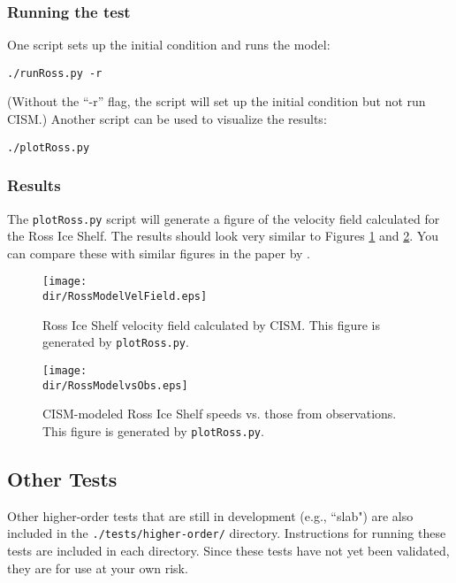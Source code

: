 \subsubsection{Running the test}
One script sets up the initial condition and runs the model:

\texttt{./runRoss.py -r}

\noindent
(Without the ``-r'' flag, the script will set up the initial condition but not run CISM.)
Another script can be used to visualize the results:

\texttt{./plotRoss.py}

\subsubsection{Results}
The \texttt{plotRoss.py} script will generate a figure of the velocity field
calculated for the Ross Ice Shelf.  The results should look very similar to Figures \ref{fig:rossresults1} and \ref{fig:rossresults2}. You can
compare these with similar figures in the paper by \citet{MacAyeal:1996vn}.

\begin{figure}[H!]
	\centering
	\texttt{[image: \\dir/RossModelVelField.eps]}
	\caption{Ross Ice Shelf velocity field calculated by CISM. This figure is generated by \texttt{plotRoss.py}.}
	\label{fig:rossresults1}
\end{figure}

\begin{figure}[H!]
	\centering
	\texttt{[image: \\dir/RossModelvsObs.eps]}
	\caption{CISM-modeled Ross Ice Shelf speeds vs. those from observations. This figure is generated by \texttt{plotRoss.py}.}
	\label{fig:rossresults2}
\end{figure}
\FloatBarrier


\subsection{Other Tests}
Other higher-order tests that are still in development (e.g., ``slab") are also included in the \texttt{./tests/higher-order/}
directory. Instructions for running these tests are included in each directory. Since these tests have not yet been validated, 
they are for use at your own risk.


